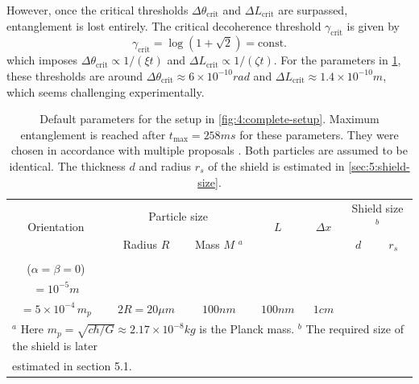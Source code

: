 However, once the critical thresholds $\Delta \theta_\mathrm{crit}$ and $\Delta L_\mathrm{crit}$ are surpassed, entanglement is lost entirely.
The critical decoherence threshold $\gamma_\mathrm{crit}$ is given by
\begin{equation}\label{eq:4:critical-point}
  \gamma_\mathrm{crit} = \log(1 + \sqrt{2}) = \mathrm{const.}
\end{equation}
which imposes $\Delta\theta_\mathrm{crit} \propto 1/(\xi t)$ and $\Delta L_\mathrm{crit} \propto 1/(\zeta t)$. 
For the parameters in \cref{tab:paramters}, these thresholds are around $\Delta \theta_\mathrm{crit} \approx 6 \times 10^{-10} \si{rad}$ and $\Delta L_\mathrm{crit} \approx 1.4 \times 10^{-10} \si{m}$, which seems challenging experimentally.
\begin{table}[!t]
  \centering
  \begin{adjustbox}{max width=\textwidth}
    \begin{tabularx}{\textwidth}{c c c c c c c}
      \toprule
      \multirow{2}{*}{Orientation} & \multicolumn{2}{c}{Particle size} & \multirow{2}{*}{$L$} & \multirow{2}{*}{$\Delta x$} & \multicolumn{2}{c}{Shield size $^b$} \\ \cline{2-3} \cline{6-7}
      & Radius $R$ & Mass $M$ $^a$ & & & $d$ & $r_s$\\
      \midrule
      \begin{tabular}{@{}c@{}}Parallel \\ ($\alpha=\beta=0$) \end{tabular} & \begin{tabular}{@{}c@{}}$10\si{\mu m}$ \\ $=10^{-5}\si{m}$\end{tabular} & \begin{tabular}{@{}c@{}}$\approx 10^{-11}\si{kg}$ \\ $=5\times 10^{-4} \, m_p$\end{tabular} & $2R=20\si{\mu m}$ & $100\si{nm}$ & $100\si{nm}$ & $1\si{cm}$ \\
      \bottomrule
      \multicolumn{7}{l}{\footnotesize $^a$ Here $m_p = \sqrt{c\hbar/G}\approx 2.17\times 10^{-8}\si{kg}$ is the Planck mass. $^b$ The required size of the shield is later} \\[-4pt]
      \multicolumn{7}{l}{\footnotesize estimated in section 5.1.} \\[5pt]
    \end{tabularx}
  \end{adjustbox}
  \caption{Default parameters for the setup in \cref{fig:4:complete-setup}. Maximum entanglement is reached after $t_\mathrm{max} = 258\si{ms}$ for these parameters. They were chosen in accordance with multiple proposals \cite{Aspelmeyer_2024,Rijavec_2021}. Both particles are assumed to be identical. The thickness $d$ and radius $r_s$ of the shield is estimated in \cref{sec:5:shield-size}.}
  \label{tab:paramters}
\end{table}
